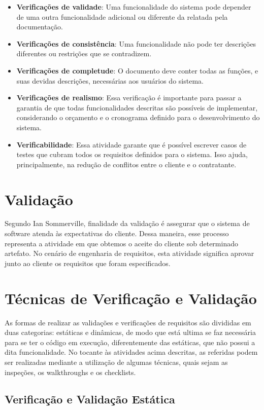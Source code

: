 \documentclass[runningheads]{llncs}
\begin{document}
\begin{itemize}
    \item \textbf{Verificações de validade}: Uma funcionalidade do sistema pode depender de uma outra funcionalidade adicional ou diferente da relatada pela documentação.
    \item \textbf{Verificações de consistência}: Uma funcionalidade não pode ter descrições diferentes ou restrições que se contradizem.
    \item\textbf{Verificações de completude}: O documento deve conter todas as funções, e suas devidas descrições, necessárias aos usuários do sistema.
    \item \textbf{Verificações de realismo}: Essa verificação é importante para passar a garantia de que todas funcionalidades descritas são possíveis de implementar, considerando o orçamento e o cronograma definido para o desenvolvimento do sistema.
    \item \textbf{Verificabilidade}: Essa atividade garante que é possível escrever casos de testes que cubram todos os requisitos definidos para o sistema. Isso ajuda, principalmente, na redução de conflitos entre o cliente e o contratante.
\end{itemize}

\section{Validação}
Segundo Ian Sommerville, finalidade da validação é assegurar que o sistema de software atenda às expectativas do cliente. Dessa maneira, esse processo representa a atividade em que obtemos o aceite do cliente sob determinado artefato. No cenário de engenharia de requisitos, esta atividade significa aprovar junto ao cliente os requisitos que foram especificados.

\section{Técnicas de Verificação e Validação}
As formas de realizar as validações e verificações de requisitos são divididas em duas categorias: estáticas e dinâmicas, de modo que está ultima se faz necessária para se ter o código em execução, diferentemente das estáticas, que não possui a dita funcionalidade. No tocante às atividades acima descritas, as referidas podem ser realizadas mediante a utilização de algumas técnicas, quais sejam as inspeções, os walkthroughs e os checklists.

\subsection{Verificação e Validação Estática}
\end{document}
